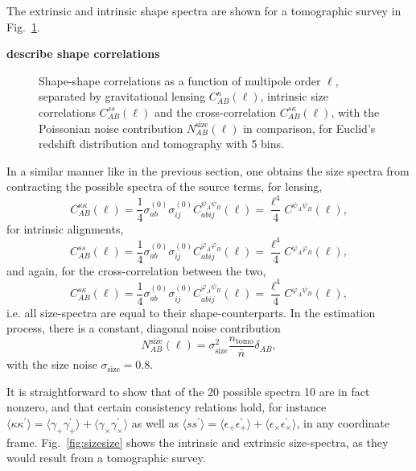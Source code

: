 \documentclass[a4paper,fleqn,usenatbib]{mnras}
\def\spirou#1{{\bf #1}}
\newcommand{\bra}{\langle}
\newcommand{\ket}{\rangle}
\begin{document}
The extrinsic and intrinsic shape spectra are shown for a tomographic survey in Fig.~\ref{fig:shapeshape}.

\spirou{describe shape correlations}


\begin{figure}
\centering
\caption{Shape-shape correlations as a function of multipole order $\ell$, separated by gravitational lensing $C_{AB}^{\kappa}(\ell)$, intrinsic size correlations $C_{AB}^{ss}(\ell)$ and the cross-correlation $C_{AB}^{s\kappa}(\ell)$, with the Poissonian noise contribution $N_{AB}^\mathrm{size}(\ell)$ in comparison, for Euclid's redshift distribution and tomography with 5 bins.}
\label{fig:shapeshape}
\end{figure}

In a similar manner like in the previous section, one obtains the size spectra from contracting the possible spectra of the source terms, for lensing,
\begin{equation}
C^{\kappa\kappa}_{AB}(\ell) = \frac{1}{4}\sigma^{(0)}_{ab}\sigma^{(0)}_{ij}C^{\psi_A\psi_B}_{abij}(\ell) = \frac{\ell^4}{4}C^{\psi_A\psi_B}(\ell),
\end{equation}
for intrinsic alignments,
\begin{equation}
C^{ss}_{AB}(\ell) = \frac{1}{4}\sigma^{(0)}_{ab}\sigma^{(0)}_{ij}C^{\varphi_A\varphi_B}_{abij}(\ell) = \frac{\ell^4}{4}C^{\varphi_A\varphi_B}(\ell),
\end{equation}
and again, for the cross-correlation between the two,
\begin{equation}
C^{s\kappa}_{AB}(\ell) = \frac{1}{4}\sigma^{(0)}_{ab}\sigma^{(0)}_{ij}C^{\varphi_A\psi_B}_{abij}(\ell) = \frac{\ell^4}{4}C^{\varphi_A\psi_B}(\ell),
\end{equation}
i.e. all size-spectra are equal to their shape-counterparts. In the estimation process, there is a constant, diagonal noise contribution
\begin{equation}
N_{AB}^\mathrm{size}(\ell) = \sigma^2_\mathrm{size} \frac{n_\mathrm{tomo}}{\bar{n}}\delta_{AB},
\end{equation}
with the size noise $\sigma_\mathrm{size} = 0.8$.

It is straightforward to show that of the 20 possible spectra 10 are in fact nonzero, and that certain consistency relations hold, for instance $\bra\kappa\kappa^\prime\ket = \bra\gamma_+\gamma_+^\prime\ket + \bra\gamma_\times\gamma_\times^\prime\ket$ as well as $\bra ss^\prime\ket = \bra\epsilon_+\epsilon_+^\prime\ket + \bra\epsilon_\times\epsilon_\times^\prime\ket$, in any coordinate frame. Fig.~\ref{fig:sizesize} shows the intrinsic and extrinsic size-spectra, as they would result from a tomographic survey.
\end{document}
